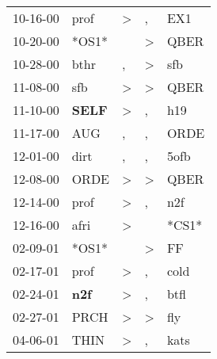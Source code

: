 \begin{supertabular}{p{0.07\textwidth}p{0.06\textwidth}p{0.02\textwidth}p{0.02\textwidth}p{0.06\textwidth}}
 10-16-00\textsuperscript{} &           prof\textsuperscript{} &     \textgreater &             , &            EX1\textsuperscript{} \\
 10-20-00\textsuperscript{} &                            *OS1* &                  &  \textgreater &           QBER\textsuperscript{} \\
 10-28-00\textsuperscript{} &           bthr\textsuperscript{} &                , &  \textgreater &            sfb\textsuperscript{} \\
 11-08-00\textsuperscript{} &            sfb\textsuperscript{} &     \textgreater &  \textgreater &           QBER\textsuperscript{} \\
 11-10-00\textsuperscript{} &  \textbf{SELF\textsuperscript{}} &     \textgreater &             , &            h19\textsuperscript{} \\
 11-17-00\textsuperscript{} &            AUG\textsuperscript{} &                , &             , &           ORDE\textsuperscript{} \\
 12-01-00\textsuperscript{} &           dirt\textsuperscript{} &                , &             , &           5ofb\textsuperscript{} \\
 12-08-00\textsuperscript{} &           ORDE\textsuperscript{} &     \textgreater &  \textgreater &           QBER\textsuperscript{} \\
 12-14-00\textsuperscript{} &           prof\textsuperscript{} &     \textgreater &             , &            n2f\textsuperscript{} \\
 12-16-00\textsuperscript{} &           afri\textsuperscript{} &     \textgreater &               &                            *CS1* \\
 02-09-01\textsuperscript{} &                            *OS1* &                  &  \textgreater &             FF\textsuperscript{} \\
 02-17-01\textsuperscript{} &           prof\textsuperscript{} &     \textgreater &             , &           cold\textsuperscript{} \\
 02-24-01\textsuperscript{} &   \textbf{n2f\textsuperscript{}} &     \textgreater &             , &           btfl\textsuperscript{} \\
 02-27-01\textsuperscript{} &           PRCH\textsuperscript{} &     \textgreater &  \textgreater &            fly\textsuperscript{} \\
 04-06-01\textsuperscript{} &           THIN\textsuperscript{} &     \textgreater &             , &           kats\textsuperscript{} \\

\end{supertabular}
